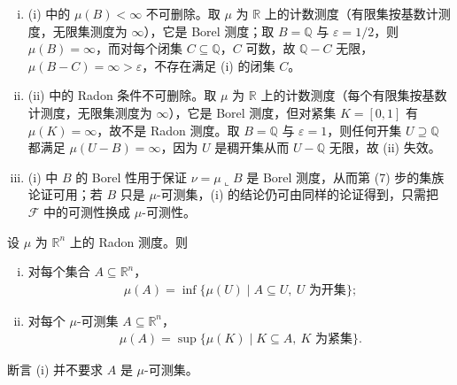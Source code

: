 \documentclass[../../main.tex]{subfiles}
\begin{document}
\begin{remark}\label{remark:ch01-lem-1-1-闭开条件}
\begin{enumerate}[(i)]
\item (i) 中的 $\mu(B)<\infty$ 不可删除。取 $\mu$ 为 $\mathbb{R}$ 上的计数测度（有限集按基数计测度，无限集测度为 $\infty$），它是 Borel 测度；取 $B=\mathbb{Q}$ 与 $\varepsilon=1/2$，则 $\mu(B)=\infty$，而对每个闭集 $C\subseteq\mathbb{Q}$，$C$ 可数，故 $\mathbb{Q}-C$ 无限，$\mu(B-C)=\infty>\varepsilon$，不存在满足 (i) 的闭集 $C$。
\item (ii) 中的 Radon 条件不可删除。取 $\mu$ 为 $\mathbb{R}$ 上的计数测度（每个有限集按基数计测度，无限集测度为 $\infty$），它是 Borel 测度，但对紧集 $K=[0,1]$ 有 $\mu(K)=\infty$，故不是 Radon 测度。取 $B=\mathbb{Q}$ 与 $\varepsilon=1$，则任何开集 $U\supseteq\mathbb{Q}$ 都满足 $\mu(U-B)=\infty$，因为 $U$ 是稠开集从而 $U-\mathbb{Q}$ 无限，故 (ii) 失效。
\item (i) 中 $B$ 的 Borel 性用于保证 $\nu=\mu\llcorner B$ 是 Borel 测度，从而第 (7) 步的集族论证可用；若 $B$ 只是 $\mu$-可测集，(i) 的结论仍可由同样的论证得到，只需把 $\mathcal{F}$ 中的可测性换成 $\mu$-可测性。
\end{enumerate}
\end{remark}

\begin{theorem}[用开集与紧集逼近]\label{theorem:ch01-1-8}
设 $\mu$ 为 $\mathbb{R}^{n}$ 上的 Radon 测度。则
\begin{enumerate}[(i)]
\item 对每个集合 $A\subseteq\mathbb{R}^{n}$，
\begin{align*}
\mu(A)=\inf\{\mu(U)\mid A\subseteq U,\ U\text{ 为开集}\};
\end{align*}
\item 对每个 $\mu$-可测集 $A\subseteq\mathbb{R}^{n}$，
\begin{align*}
\mu(A)=\sup\{\mu(K)\mid K\subseteq A,\ K\text{ 为紧集}\}.
\end{align*}
\end{enumerate}
\end{theorem}

\begin{remark}\label{remark:ch01-thm-1-8-要点}
断言 (i) 并不要求 $A$ 是 $\mu$-可测集。
\end{remark}
\end{document}
